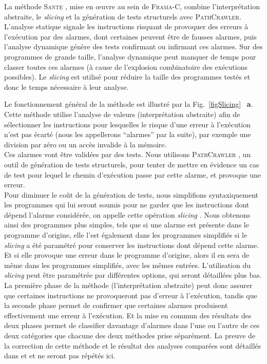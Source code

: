 La méthode \textsc{Sante} \cite{TheseOmar, SANTE}, mise en \oe{}uvre au sein de
\textsc{Frama-C}, combine l'interprétation abstraite, le {\em slicing} et la
génération de tests structurels avec \textsc{PathCrawler}. L’analyse statique
signale les instructions risquant de provoquer des erreurs à l’exécution par des
alarmes, dont certaines peuvent être de fausses alarmes, puis l’analyse
dynamique génère des tests confirmant ou infirmant ces alarmes. Sur des
programmes de grande taille, l'analyse dynamique peut manquer de temps pour
classer toutes ces alarmes (à cause de l'explosion combinatoire des exécutions
possibles). Le {\em slicing} est utilisé pour réduire la taille des programmes
testés et donc le temps nécessaire à leur analyse.

Le fonctionnement général de la méthode est illustré par la
Fig.~\ref{figSlicing} ~\textbf{a}. Cette méthode utilise l'analyse de valeurs
(interprétation abstraite) afin de sélectionner les instructions pour lesquelles
le risque d'une erreur à l'exécution n'est pas écarté (nous les appellerons
``alarmes'' par la suite), par exemple une division par zéro ou un accès
invalide à la mémoire.\\

Ces alarmes vont être validées par des tests. Nous utilisons
\textsc{PathCrawler} \cite{PathCrawler}, un outil de génération de tests
structurels, pour tenter de mettre en évidence un cas de test pour lequel le
chemin d'exécution passe par cette alarme, et provoque une erreur.\\

Pour diminuer le coût de la génération de tests, nous simplifions
syntaxiquement les programmes qui lui seront soumis pour ne garder que les
instructions dont dépend l'alarme considérée, on appelle cette opération
{\em slicing} \cite{slicing}. Nous obtenons ainsi des programmes plus simples,
tels que si une alarme est présente dans le programme d'origine, elle l'est
également dans les programmes simplifiés si le {\em slicing} a été paramétré
pour conserver les instructions dont dépend cette alarme. Et si elle provoque
une erreur dans le programme d'origine, alors il en sera de même dans les
programmes simplifiés, avec les mêmes entrées. L'utilisation du {\em slicing}
peut être paramétrée par différentes options, qui seront détaillées plus bas.\\

La première phase de la méthode (l'interprétation abstraite) peut donc assurer
que certaines instructions ne provoqueront pas d'erreur à l'exécution, tandis
que la seconde phase permet de confirmer que certaines alarmes produisent
effectivement une erreur à l'exécution. Et la mise en commun des résultats des
deux phases permet de classifier davantage d'alarmes dans l'une ou l'autre de
ces deux catégories que chacune des deux méthodes prise séparément. La preuve de
la correction de cette méthode et le résultat des analyses comparées sont
détaillés dans \cite{TheseOmar} et \cite{SANTE} et ne seront pas répétés ici.\\

